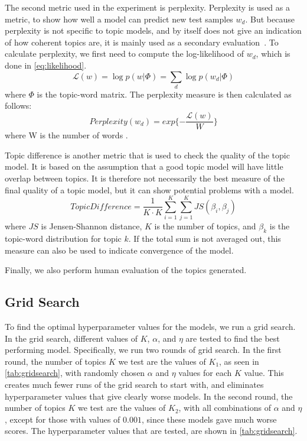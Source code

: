 The second metric used in the experiment is perplexity.
Perplexity is used as a metric, to show how well a model can predict new test samples $w_d$.
But because perplexity is not specific to topic models, and by itself does not give an indication of how coherent topics are, it is mainly used as a secondary evaluation~\cite{tea_leaves}.
To calculate perplexity, we first need to compute the log-likelihood of $w_d$, which is done in \autoref{eq:likelihood}.
\begin{equation}\label{eq:likelihood}
	\mathcal{L}(w) = \log p(w|\Phi) = \sum_{d} \log p(w_d|\Phi)
\end{equation}
\noindent where $\Phi$ is the topic-word matrix.
The perplexity measure is then calculated as follows:
\begin{equation}
	Perplexity(w_d) = exp \{-\frac{\mathcal{L}(w)}{W}\}
\end{equation}
\noindent where W is the number of words \cite{de2008evaluating}.

Topic difference is another metric that is used to check the quality of the topic model.
It is based on the assumption that a good topic model will have little overlap between topics.
It is therefore not necessarily the best measure of the final quality of a topic model, but it can show potential problems with a model.
\begin{equation}
	TopicDifference = \frac{1}{K \cdot K} \sum_{i=1}^{K} \sum_{j=1}^{K} JS(\beta_{i},\beta_{j})
\end{equation}
\noindent where $JS$ is Jensen-Shannon distance, $K$ is the number of topics, and $\beta_{k}$ is the topic-word distribution for topic $k$.
If the total sum is not averaged out, this measure can also be used to indicate convergence of the model.

Finally, we also perform human evaluation of the topics generated.

\subsection{Grid Search}\label{sec:experiment_gridsearch}
To find the optimal hyperparameter values for the models, we run a grid search.
In the grid search, different values of $K$, $\alpha$, and $\eta$ are tested to find the best performing model.
Specifically, we run two rounds of grid search.
In the first round, the number of topics $K$ we test are the values of $K_1$, as seen in \autoref{tab:gridsearch}, with randomly chosen $\alpha$ and $\eta$ values for each $K$ value.
This creates much fewer runs of the grid search to start with, and eliminates hyperparameter values that give clearly worse models.
In the second round, the number of topics $K$ we test are the values of $K_2$, with all combinations of $\alpha$ and $\eta$, except for those with values of $0.001$, since these models gave much worse scores.
The hyperparameter values that are tested, are shown in \autoref{tab:gridsearch}.

